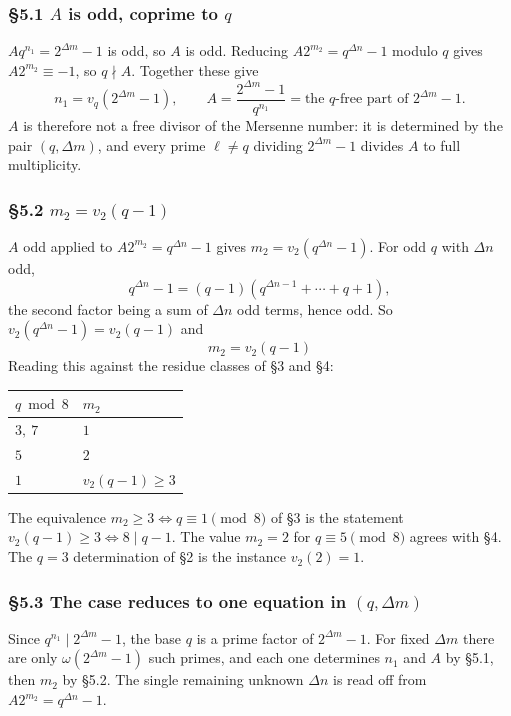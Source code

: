\documentclass[11pt]{article}
\begin{document}
\subsubsection*{\S5.1 $A$ is odd, coprime to $q$}

$A q^{n_1} = 2^{\Delta m} - 1$ is odd, so $A$ is odd. Reducing $A 2^{m_2} = q^{\Delta n} - 1$ modulo $q$ gives $A2^{m_2} \equiv -1$, so $q \nmid A$. Together these give
\[
n_1 = v_q\!\left(2^{\Delta m} - 1\right), \qquad
A = \frac{2^{\Delta m}-1}{q^{n_1}} = \text{the } q\text{-free part of } 2^{\Delta m}-1 .
\]
$A$ is therefore not a free divisor of the Mersenne number: it is determined by the pair $(q, \Delta m)$, and every prime $\ell \neq q$ dividing $2^{\Delta m}-1$ divides $A$ to full multiplicity.

\subsubsection*{\S5.2 $m_2 = v_2(q-1)$}

$A$ odd applied to $A2^{m_2} = q^{\Delta n} - 1$ gives $m_2 = v_2(q^{\Delta n}-1)$. For odd $q$ with $\Delta n$ odd,
\[
q^{\Delta n} - 1 = (q-1)\left(q^{\Delta n - 1} + \cdots + q + 1\right),
\]
the second factor being a sum of $\Delta n$ odd terms, hence odd. So $v_2(q^{\Delta n}-1) = v_2(q-1)$ and
\[
\boxed{\,m_2 = v_2(q-1)\,}
\]
Reading this against the residue classes of \S3 and \S4:
\begin{center}
\begin{tabular}{ll}
\hline
$q \bmod 8$ & $m_2$ \\
\hline
$3,\ 7$ & $1$ \\
$5$ & $2$ \\
$1$ & $v_2(q-1) \geq 3$ \\
\hline
\end{tabular}
\end{center}
The equivalence $m_2 \geq 3 \iff q \equiv 1 \pmod 8$ of \S3 is the statement $v_2(q-1) \geq 3 \iff 8 \mid q-1$. The value $m_2 = 2$ for $q \equiv 5 \pmod 8$ agrees with \S4. The $q = 3$ determination of \S2 is the instance $v_2(2) = 1$.

\subsubsection*{\S5.3 The case reduces to one equation in $(q, \Delta m)$}

Since $q^{n_1} \mid 2^{\Delta m}-1$, the base $q$ is a prime factor of $2^{\Delta m}-1$. For fixed $\Delta m$ there are only $\omega\!\left(2^{\Delta m}-1\right)$ such primes, and each one determines $n_1$ and $A$ by \S5.1, then $m_2$ by \S5.2. The single remaining unknown $\Delta n$ is read off from $A2^{m_2} = q^{\Delta n}-1$.
\end{document}
